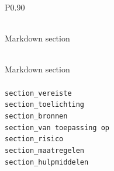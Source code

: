 \begingroup
\small
\setlength{\tabcolsep}{4pt}
\renewcommand{\arraystretch}{1.1}
\setlength{\LTcapwidth}{\textwidth}
\setlength{\LTleft}{0pt plus 1fill}
\setlength{\LTright}{0pt plus 1fill}
\begin{longtable}{P{0.90\textwidth}}
\caption{Markdown sections identified in Algoritmekader requirement files.} \label{tab:algoritmekader-section-fields} \\
\toprule
Markdown section \\
\midrule
\endfirsthead
\caption[]{Markdown sections identified in Algoritmekader requirement files.} \\
\toprule
Markdown section \\
\midrule
\endhead
\midrule
{} \\
\midrule
\endfoot
\bottomrule
\endlastfoot
\texttt{section\_\allowbreak{}vereiste} \\
\texttt{section\_\allowbreak{}toelichting} \\
\texttt{section\_\allowbreak{}bronnen} \\
\texttt{section\_\allowbreak{}van toepassing op} \\
\texttt{section\_\allowbreak{}risico} \\
\texttt{section\_\allowbreak{}maatregelen} \\
\texttt{section\_\allowbreak{}hulpmiddelen} \\
\end{longtable}
\endgroup
